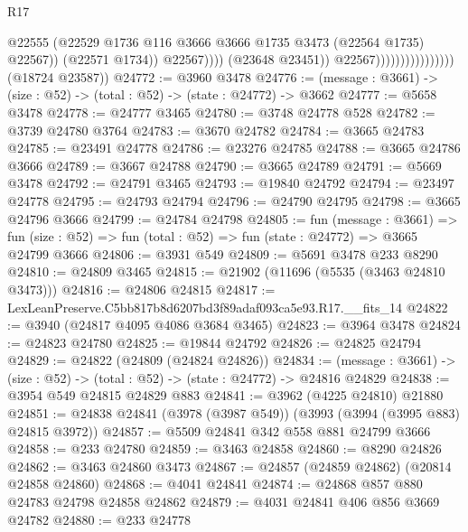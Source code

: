 \begin{lexlean}{R17}
\begin{coremodule}
                                                    @22555
                                                    (@22529
                                                      @1736
                                                      @116
                                                      @3666
                                                      @3666
                                                      @1735
                                                      @3473
                                                      (@22564 @1735)
                                                      @22567))
                                                  (@22571 @1734))
                                                @22567))))
                                        (@23648 @23451))
                                      @22567))))))))))))))))
      (@18724 @23587))
@24772 := @3960 @3478
@24776 := (message : @3661) -> (size : @52) -> (total : @52) -> (state : @24772) -> @3662
@24777 := @5658 @3478
@24778 := @24777 @3465
@24780 := @3748 @24778 @528
@24782 := @3739 @24780 @3764
@24783 := @3670 @24782
@24784 := @3665 @24783
@24785 := @23491 @24778
@24786 := @23276 @24785
@24788 := @3665 @24786 @3666
@24789 := @3667 @24788
@24790 := @3665 @24789
@24791 := @5669 @3478
@24792 := @24791 @3465
@24793 := @19840 @24792
@24794 := @23497 @24778
@24795 := @24793 @24794
@24796 := @24790 @24795
@24798 := @3665 @24796 @3666
@24799 := @24784 @24798
@24805 := fun (message : @3661) =>
  fun (size : @52) => fun (total : @52) => fun (state : @24772) => @3665 @24799 @3666
@24806 := @3931 @549
@24809 := @5691 @3478 @233 @8290
@24810 := @24809 @3465
@24815 := @21902 (@11696 (@5535 (@3463 @24810 @3473)))
@24816 := @24806 @24815
@24817 := LexLeanPreserve.C5bb817b8d6207bd3f89adaf093ca5e93.R17.__fits_14
@24822 := @3940 (@24817 @4095 @4086 @3684 @3465)
@24823 := @3964 @3478
@24824 := @24823 @24780
@24825 := @19844 @24792
@24826 := @24825 @24794
@24829 := @24822 (@24809 (@24824 @24826))
@24834 := (message : @3661) -> (size : @52) -> (total : @52) -> (state : @24772) -> @24816 @24829
@24838 := @3954 @549 @24815 @24829 @883
@24841 := @3962 (@4225 @24810) @21880
@24851 := @24838 @24841 (@3978 (@3987 @549)) (@3993 (@3994 (@3995 @883) @24815 @3972))
@24857 := @5509 @24841 @342 @558 @881 @24799 @3666
@24858 := @233 @24780
@24859 := @3463 @24858
@24860 := @8290 @24826
@24862 := @3463 @24860 @3473
@24867 := @24857 (@24859 @24862) (@20814 @24858 @24860)
@24868 := @4041 @24841
@24874 := @24868 @857 @880 @24783 @24798 @24858 @24862
@24879 := @4031 @24841 @406 @856 @3669 @24782
@24880 := @233 @24778

\end{coremodule}
\end{lexlean}

